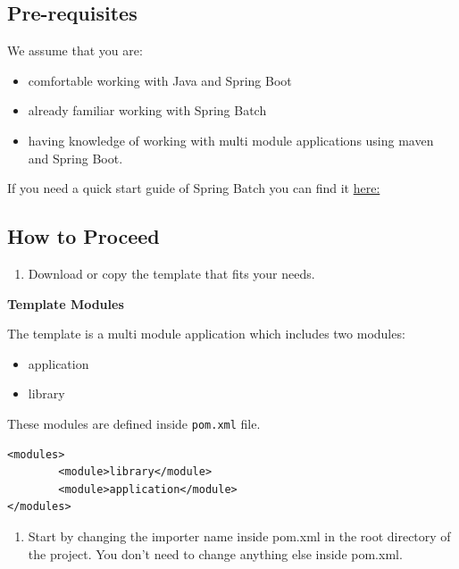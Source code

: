 \subsection{Pre-requisites}

We assume that you are:

\begin{itemize}
\tightlist
\item
  comfortable working with Java and Spring Boot
\item
  already familiar working with Spring Batch
\item
  having knowledge of working with multi module applications using maven
  and Spring Boot.
\end{itemize}

If you need a quick start guide of Spring Batch you can find it
\href{https://projects.spring.io/spring-batch/}{here:}

\subsection{How to Proceed}

\begin{enumerate}
\def\labelenumi{\arabic{enumi}.}
\tightlist
\item
  Download or copy the template that fits your needs.
\end{enumerate}

\textbf{Template Modules}

The template is a multi module application which includes two modules:

\begin{itemize}
\tightlist
\item
  application
\item
  library
\end{itemize}

These modules are defined inside \texttt{pom.xml} file.

\begin{verbatim}
<modules>
        <module>library</module>
        <module>application</module>
</modules>
\end{verbatim}

\begin{enumerate}
\def\labelenumi{\arabic{enumi}.}
\setcounter{enumi}{1}
\tightlist
\item
  Start by changing the importer name inside pom.xml in the root
  directory of the project. You don't need to change anything else
  inside pom.xml.
\end{enumerate}

